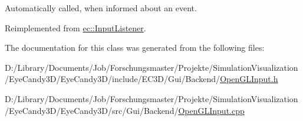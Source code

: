 Automatically called, when informed about an event. 



Reimplemented from \mbox{\hyperlink{classec_1_1_input_listener_a9ceaefc79c6b0b260e88454616137840}{ec\+::\+Input\+Listener}}.



The documentation for this class was generated from the following files\+:\begin{DoxyCompactItemize}
\item 
D\+:/\+Library/\+Documents/\+Job/\+Forschungsmaster/\+Projekte/\+Simulation\+Visualization/\+Eye\+Candy3\+D/\+Eye\+Candy3\+D/include/\+E\+C3\+D/\+Gui/\+Backend/\mbox{\hyperlink{_open_g_l_input_8h}{Open\+G\+L\+Input.\+h}}\item 
D\+:/\+Library/\+Documents/\+Job/\+Forschungsmaster/\+Projekte/\+Simulation\+Visualization/\+Eye\+Candy3\+D/\+Eye\+Candy3\+D/src/\+Gui/\+Backend/\mbox{\hyperlink{_open_g_l_input_8cpp}{Open\+G\+L\+Input.\+cpp}}\end{DoxyCompactItemize}
